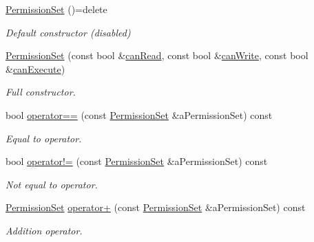 \begin{DoxyCompactItemize}
\item 
\hyperlink{classlibrary_1_1core_1_1fs_1_1_permission_set_a8a6eb39cc2a8bca92a657d065d3e36ba}{Permission\+Set} ()=delete
\begin{DoxyCompactList}\small\item\em Default constructor (disabled) \end{DoxyCompactList}\item 
\hyperlink{classlibrary_1_1core_1_1fs_1_1_permission_set_a39ee30a6f35f325c1cd7bcd307ab11aa}{Permission\+Set} (const bool \&\hyperlink{classlibrary_1_1core_1_1fs_1_1_permission_set_af31f6c5e1bd75102749648fd41882beb}{can\+Read}, const bool \&\hyperlink{classlibrary_1_1core_1_1fs_1_1_permission_set_a12851523996c6c4414749ee9c2f3bbd2}{can\+Write}, const bool \&\hyperlink{classlibrary_1_1core_1_1fs_1_1_permission_set_a40da22aa91ee4c8963c1c5434dd8486c}{can\+Execute})
\begin{DoxyCompactList}\small\item\em Full constructor. \end{DoxyCompactList}\item 
bool \hyperlink{classlibrary_1_1core_1_1fs_1_1_permission_set_a5233d51751bf61d545a283ee6767af47}{operator==} (const \hyperlink{classlibrary_1_1core_1_1fs_1_1_permission_set}{Permission\+Set} \&a\+Permission\+Set) const
\begin{DoxyCompactList}\small\item\em Equal to operator. \end{DoxyCompactList}\item 
bool \hyperlink{classlibrary_1_1core_1_1fs_1_1_permission_set_a7549184997b592bb790ccad3e9084a19}{operator!=} (const \hyperlink{classlibrary_1_1core_1_1fs_1_1_permission_set}{Permission\+Set} \&a\+Permission\+Set) const
\begin{DoxyCompactList}\small\item\em Not equal to operator. \end{DoxyCompactList}\item 
\hyperlink{classlibrary_1_1core_1_1fs_1_1_permission_set}{Permission\+Set} \hyperlink{classlibrary_1_1core_1_1fs_1_1_permission_set_ade354e83f2e281f9a870e73479cfa83a}{operator+} (const \hyperlink{classlibrary_1_1core_1_1fs_1_1_permission_set}{Permission\+Set} \&a\+Permission\+Set) const
\begin{DoxyCompactList}\small\item\em Addition operator. \end{DoxyCompactList}\item 

\end{DoxyCompactItemize}

